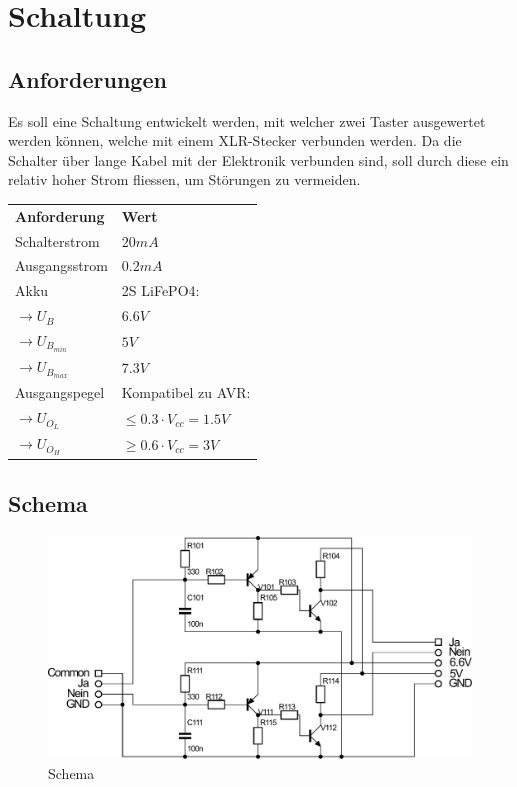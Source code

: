 
\section{Schaltung}

\subsection{Anforderungen}
Es soll eine Schaltung entwickelt werden, mit welcher zwei Taster ausgewertet werden können, welche mit einem XLR-Stecker verbunden werden. Da die Schalter über lange Kabel mit der Elektronik verbunden sind, soll durch diese ein relativ hoher Strom fliessen, um Störungen zu vermeiden. 

\begin{table}[h!]
  \begin{tabular}{@{}ll}
    \textbf{Anforderung}        & \textbf{Wert} \\
    Schalterstrom               & $20 mA$ \\
    Ausgangsstrom               & $0.2 mA$ \\
    Akku                        & 2S LiFePO4: \\
    $\rightarrow U_B$           & $6.6 V$ \\
    $\rightarrow U_{B_{min}}$   & $5 V$ \\
    $\rightarrow U_{B_{max}}$   & $7.3 V$ \\
    Ausgangspegel               & Kompatibel zu AVR: \\
    $\rightarrow U_{O_L}$       & $\leq 0.3 \cdot V_{cc} = 1.5 V$ \\
    $\rightarrow U_{O_H}$       & $\geq 0.6 \cdot V_{cc} = 3 V$ \\
    
  \end{tabular}
\end{table}

\subsection{Schema}
\begin{figure}[h!]
	\centering
	\includegraphics[scale=\schscale]{fig/xlr_pegelwandler_v_1_2_sch.pdf}
	\caption{Schema}
	\label{sch:pegw}
\end{figure}

